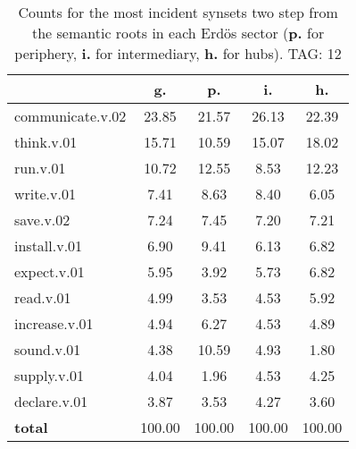 \begin{table}[h!]
\begin{center}
\begin{tabular}{| l || c | c | c | c |}\hline
 & {\bf g.} & {\bf p.} & {\bf i.} & {\bf h.} \\\hline\hline
communicate.v.02 & 23.85  & 21.57  & 26.13  & 22.39 \\\hline
think.v.01 & 15.71  & 10.59  & 15.07  & 18.02 \\\hline
run.v.01 & 10.72  & 12.55  & 8.53  & 12.23 \\\hline
write.v.01 & 7.41  & 8.63  & 8.40  & 6.05 \\\hline
save.v.02 & 7.24  & 7.45  & 7.20  & 7.21 \\\hline
install.v.01 & 6.90  & 9.41  & 6.13  & 6.82 \\\hline
expect.v.01 & 5.95  & 3.92  & 5.73  & 6.82 \\\hline
read.v.01 & 4.99  & 3.53  & 4.53  & 5.92 \\\hline
increase.v.01 & 4.94  & 6.27  & 4.53  & 4.89 \\\hline
sound.v.01 & 4.38  & 10.59  & 4.93  & 1.80 \\\hline
supply.v.01 & 4.04  & 1.96  & 4.53  & 4.25 \\\hline
declare.v.01 & 3.87  & 3.53  & 4.27  & 3.60 \\\hline\hline
{{\bf total}} & 100.00  & 100.00  & 100.00  & 100.00 \\\hline
\end{tabular}
\caption{Counts for the most incident synsets two step from the semantic roots in each Erd\"os sector ({\bf p.} for periphery, {\bf i.} for intermediary, {\bf h.} for hubs). TAG: 12}
\end{center}
\end{table}
